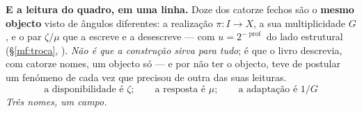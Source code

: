 \documentclass[../livro.tex]{subfiles}
\begin{document}
\medskip\noindent\textbf{E a leitura do quadro, em uma linha.} Doze dos catorze
fechos são o \textbf{mesmo objecto} visto de ângulos diferentes: a realização
$\pi\colon I\to X$, a sua multiplicidade $G$, e o par $\zeta/\mu$ que a escreve e
a desescreve --- com $u=2^{-\operatorname{prof}}$ do lado estrutural
(\S\ref{mf:troca}, ). \emph{Não é que a construção sirva para tudo}; é que o livro
descrevia, com catorze nomes, um objecto só --- e por não ter o objecto, teve de
postular um fenómeno de cada vez que precisou de outra das suas leituras.
\[
\boxed{\;\text{a disponibilidade é }\zeta;\qquad
\text{a resposta é }\mu;\qquad
\text{a adaptação é }1/G\;}
\]
\emph{Três nomes, um campo.}
\end{document}
